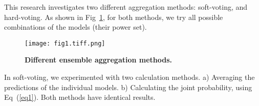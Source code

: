 \documentclass[10pt,letterpaper]{article}
\begin{document}
\begin{table}[!ht]
\begin{adjustwidth}{-1.0in}{0in} %
  \centering
  \caption{
    {\bf The r@k metrics for the networks used to construct the  ensemble model.}}
  \label{table4}
  \end{adjustwidth}
\end{table}

This research investigates two different aggregation methods: soft-voting, and hard-voting. As shown in Fig~\ref{fig1}, for both methods, we try all possible  combinations of the models (their power set).

\begin{figure}[!h]
\caption{{\bf Different ensemble aggregation methods.}}
\texttt{[image: fig1.tiff.png]}
\label{fig1}
\end{figure}

In soft-voting, we experimented with two calculation methods. a) Averaging the predictions of the individual models. b) Calculating the joint probability, using Eq~(\ref{eq1}). Both methods have identical results.
\end{document}
